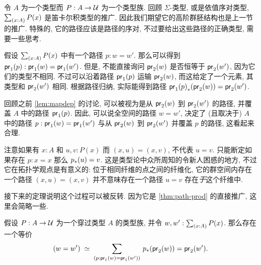 %
令 $A$ 为一个类型而 $P:A\to\mathcal{U}$ 为一个类型族.
回顾 $\Sigma$-类型, 或是依值序对类型, $\sm{x:A} P(x)$ 是笛卡尔积类型的推广.
因此我们期望它的高阶群胚结构也是上一节的推广.
特殊的, 它的路径应该是路径的序对, 不过要给出这些路径的正确类型, 需要一些思考.

假设 $\sm{x:A}P(x)$ 中有一个路径 $p:w=w'$.
那么可以得到 ${\mathsf{pr}_{1}}\mathopen{}\left({p}\right)\mathclose{}:\mathsf{pr}_{1}(w)=\mathsf{pr}_{1}(w')$.
但是, 不能直接询问 $\mathsf{pr}_{2}(w)$ 是否恒等于 $\mathsf{pr}_{2}(w')$, 因为它们的类型不相同.
不过可以沿着路径 ${\mathsf{pr}_{1}}\mathopen{}\left({p}\right)\mathclose{}$ 运输 $\mathsf{pr}_{2}(w)$, 而这给定了一个元素, 其类型和 $\mathsf{pr}_{2}(w')$ 相同.
根据路径归纳, 实际能得到路径 ${{\mathsf{pr}_{1}}\mathopen{}\left({p}\right)\mathclose{}}_{*}\mathopen{}\left({\mathsf{pr}_{2}(w)}\right)\mathclose{}=\mathsf{pr}_{2}(w')$.

回顾之前 \cref{lem:mapdep} 的讨论,
可以被视为是从 $\mathsf{pr}_{2}(w)$ 到 $\mathsf{pr}_{2}(w')$ 的路径, 并覆盖 $A$ 中的路径 ${\mathsf{pr}_{1}}\mathopen{}\left({p}\right)\mathclose{}$.
%
%
因此, 可以说全空间的路径 $w=w'$, 决定了 (且取决于) $A$ 中的路径 $p:\mathsf{pr}_{1}(w)=\mathsf{pr}_{1}(w')$ 与从 $\mathsf{pr}_{2}(w)$ 到 $\mathsf{pr}_{2}(w')$ 并覆盖 $p$ 的路径, 这看起来合理.

\begin{rmk}
    注意如果有 $x:A$ 和 $u,v:P(x)$ 而 $(x,u)=(x,v)$, 不代表 $u=v$.
    只能断定如果存在 $p:x=x$ 那么 ${p}_{*}\mathopen{}\left({u}\right)\mathclose{} = v$.
    这是类型论中众所周知的令新人困惑的地方, 不过它在拓扑学观点是有意义的:
    位于相同纤维的点之间的纤维化, 它的群空间内存在一个路径 $(x,u)=(x,v)$ 并不意味存在一个路径 $u=v$ 存在\emph{于}这个纤维中.
\end{rmk}

接下来的定理说明这个过程可以被反转.
因为它是 \cref{thm:path-prod} 的直接推广, 这里会简略一些.

\begin{thm}
    \label{thm:path-sigma}
    假设 $P:A\to\mathcal{U}$ 为一个穿过类型 $A$ 的类型族, 并令 $w,w':\sm{x:A}P(x)$. 那么存在一个等价
    \begin{equation*}
        \eqvspaced{(w=w')}{\dsm{p:\proj{1}(w)=\proj{1}(w')} \trans{p}{\proj{2}(w)}=\proj{2}(w')}.
    \end{equation*}
\end{thm}

